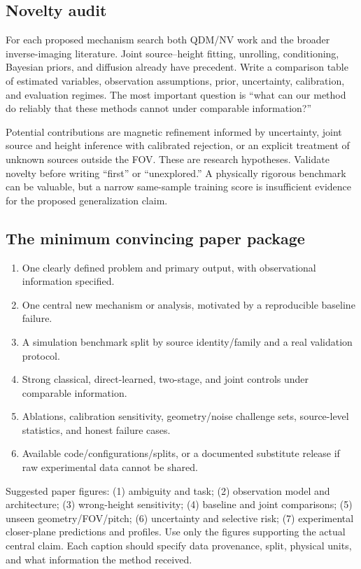 \subsection{Novelty audit}
For each proposed mechanism search both QDM/NV work and the broader inverse-imaging literature. Joint source--height fitting, unrolling, conditioning, Bayesian priors, and diffusion already have precedent. Write a comparison table of estimated variables, observation assumptions, prior, uncertainty, calibration, and evaluation regimes. The most important question is ``what can our method do reliably that these methods cannot under comparable information?''

Potential contributions are magnetic refinement informed by uncertainty, joint source and height inference with calibrated rejection, or an explicit treatment of unknown sources outside the FOV. These are research hypotheses. Validate novelty before writing ``first'' or ``unexplored.'' A physically rigorous benchmark can be valuable, but a narrow same-sample training score is insufficient evidence for the proposed generalization claim.

\subsection{The minimum convincing paper package}
\begin{enumerate}
\item One clearly defined problem and primary output, with observational information specified.
\item One central new mechanism or analysis, motivated by a reproducible baseline failure.
\item A simulation benchmark split by source identity/family and a real validation protocol.
\item Strong classical, direct-learned, two-stage, and joint controls under comparable information.
\item Ablations, calibration sensitivity, geometry/noise challenge sets, source-level statistics, and honest failure cases.
\item Available code/configurations/splits, or a documented substitute release if raw experimental data cannot be shared.
\end{enumerate}

Suggested paper figures: (1) ambiguity and task; (2) observation model and architecture; (3) wrong-height sensitivity; (4) baseline and joint comparisons; (5) unseen geometry/FOV/pitch; (6) uncertainty and selective risk; (7) experimental closer-plane predictions and profiles. Use only the figures supporting the actual central claim. Each caption should specify data provenance, split, physical units, and what information the method received.

